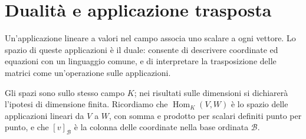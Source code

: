 \chapter{Dualità e applicazione trasposta}
\label{cap:dualita}

Un'applicazione lineare a valori nel campo associa uno scalare a ogni vettore. Lo spazio di queste applicazioni è il duale: consente di descrivere coordinate ed equazioni con un linguaggio comune, e di interpretare la trasposizione delle matrici come un'operazione sulle applicazioni.

Gli spazi sono sullo stesso campo $K$; nei risultati sulle dimensioni si dichiarerà l'ipotesi di dimensione finita. Ricordiamo che $\operatorname{Hom}_K(V,W)$ è lo spazio delle applicazioni lineari da $V$ a $W$, con somma e prodotto per scalari definiti punto per punto, e che $[v]_{\mathcal B}$ è la colonna delle coordinate nella base ordinata $\mathcal B$.



